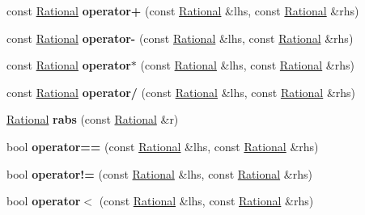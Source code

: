 \begin{DoxyCompactItemize}
const \mbox{\hyperlink{classRational}{Rational}} {\bfseries operator+} (const \mbox{\hyperlink{classRational}{Rational}} \&lhs, const \mbox{\hyperlink{classRational}{Rational}} \&rhs)
\item 
\mbox{\label{group__general_ga46d4a6e5db46addfa0d0608e3266571b}} 
const \mbox{\hyperlink{classRational}{Rational}} {\bfseries operator-\/} (const \mbox{\hyperlink{classRational}{Rational}} \&lhs, const \mbox{\hyperlink{classRational}{Rational}} \&rhs)
\item 
\mbox{\label{group__general_ga0334562ad4831b5b35238fe58bddabb0}} 
const \mbox{\hyperlink{classRational}{Rational}} {\bfseries operator$\ast$} (const \mbox{\hyperlink{classRational}{Rational}} \&lhs, const \mbox{\hyperlink{classRational}{Rational}} \&rhs)
\item 
\mbox{\label{group__general_gac87738e39a4f47b27c620375a59b06ee}} 
const \mbox{\hyperlink{classRational}{Rational}} {\bfseries operator/} (const \mbox{\hyperlink{classRational}{Rational}} \&lhs, const \mbox{\hyperlink{classRational}{Rational}} \&rhs)
\item 
\mbox{\label{group__general_ga3a2f2c8e28386a081128d450e66999dd}} 
\mbox{\hyperlink{classRational}{Rational}} {\bfseries rabs} (const \mbox{\hyperlink{classRational}{Rational}} \&r)
\item 
\mbox{\label{group__general_ga436606f8682952468f6a5b339d972178}} 
bool {\bfseries operator==} (const \mbox{\hyperlink{classRational}{Rational}} \&lhs, const \mbox{\hyperlink{classRational}{Rational}} \&rhs)
\item 
\mbox{\label{group__general_gaca39bd2856e9682cf97234d046c0d52f}} 
bool {\bfseries operator!=} (const \mbox{\hyperlink{classRational}{Rational}} \&lhs, const \mbox{\hyperlink{classRational}{Rational}} \&rhs)
\item 
\mbox{\label{group__general_gaf34fe75e417e48c51e1d2751d9264569}} 
bool {\bfseries operator$<$} (const \mbox{\hyperlink{classRational}{Rational}} \&lhs, const \mbox{\hyperlink{classRational}{Rational}} \&rhs)
\item 
\mbox{\label{group__general_ga8ae410bb40221ea8f30a6057dff05a1f}} 

\end{DoxyCompactItemize}
